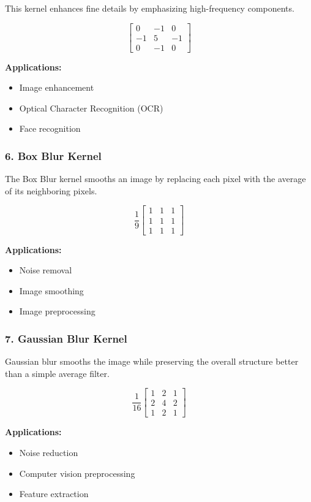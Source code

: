 \documentclass[11pt]{article}
\begin{document}
This kernel enhances fine details by emphasizing high-frequency components.

\[
\begin{bmatrix}
0 & -1 & 0\\
-1 & 5 & -1\\
0 & -1 & 0
\end{bmatrix}
\]

\textbf{Applications:}
\begin{itemize}
\item Image enhancement
\item Optical Character Recognition (OCR)
\item Face recognition
\end{itemize}

\subsubsection*{6. Box Blur Kernel}

The Box Blur kernel smooths an image by replacing each pixel with the average of its neighboring pixels.

\[
\frac{1}{9}
\begin{bmatrix}
1 & 1 & 1\\
1 & 1 & 1\\
1 & 1 & 1
\end{bmatrix}
\]

\textbf{Applications:}
\begin{itemize}
\item Noise removal
\item Image smoothing
\item Image preprocessing
\end{itemize}

\subsubsection*{7. Gaussian Blur Kernel}

Gaussian blur smooths the image while preserving the overall structure better than a simple average filter.

\[
\frac{1}{16}
\begin{bmatrix}
1 & 2 & 1\\
2 & 4 & 2\\
1 & 2 & 1
\end{bmatrix}
\]

\textbf{Applications:}
\begin{itemize}
\item Noise reduction
\item Computer vision preprocessing
\item Feature extraction
\end{itemize}
\end{document}
